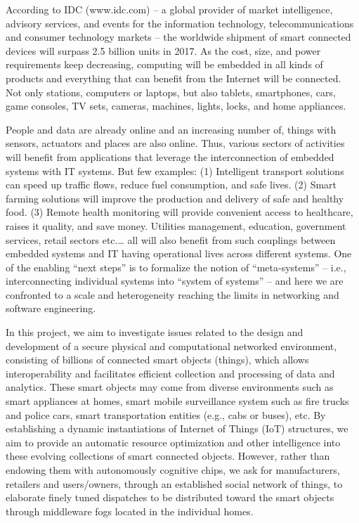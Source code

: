 
According to IDC (www.idc.com) -- a global provider of market intelligence, advisory services, and events for the information technology, telecommunications and consumer technology markets -- the worldwide shipment of smart connected devices will surpass 2.5 billion units in 2017. As the cost, size, and power requirements keep decreasing, computing will be embedded in all kinds of products and everything that can benefit from the Internet will be connected. Not only stations, computers or laptops, but also tablets, smartphones, cars, game consoles, TV sets, cameras, machines, lights, locks, and home appliances.

People and data are already online and an increasing number of, things with sensors, actuators and places are  also online.  Thus, various sectors of activities will benefit from applications that leverage the interconnection of embedded systems with IT systems. But few examples: (1) Intelligent transport solutions can speed up traffic flows, reduce fuel consumption, and safe lives. (2) Smart farming solutions will improve the production and delivery of safe and healthy food. (3) Remote health monitoring will provide convenient access to healthcare, raises it quality, and save money. Utilities management, education, government services, retail sectors etc.… all will also benefit from such couplings between embedded systems and IT having operational lives across  different systems. One of the enabling “next steps” is to formalize the notion of “meta-systems” – i.e., interconnecting  individual systems into “system of systems” –  and here we are confronted to  a scale and heterogeneity  reaching the  limits in networking and software engineering. 

In this project, we aim to investigate issues related to the design and development of a secure physical and computational networked environment, consisting of billions of connected smart objects (things), which allows interoperability and facilitates efficient collection and processing of data and analytics. These smart objects may come from diverse environments such as smart appliances at homes, smart mobile surveillance system such as fire trucks and police cars, smart transportation entities (e.g., cabs or buses), etc. By establishing a dynamic instantiations of Internet of Things (IoT) structures, we aim to  provide an automatic resource optimization and other intelligence into these evolving collections of smart connected objects. However, rather than endowing them with autonomously cognitive chips, we ask for manufacturers, retailers and users/owners, through an established social network of things, to elaborate finely tuned dispatches to be distributed toward the smart objects through middleware fogs located in the individual homes. 

